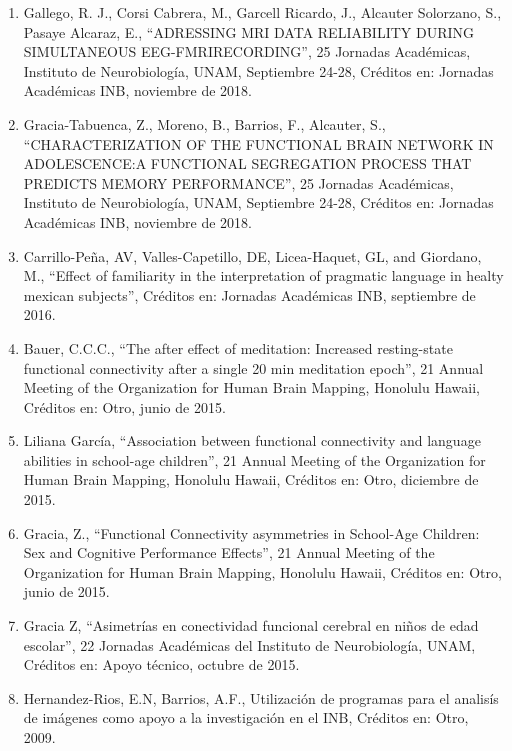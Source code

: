 \begin{enumerate}
\item Gallego, R. J., Corsi Cabrera, M., Garcell Ricardo, J., Alcauter Solorzano, S., Pasaye Alcaraz, E., “ADRESSING MRI DATA RELIABILITY 
DURING 
SIMULTANEOUS EEG-FMRIRECORDING”, 25 Jornadas Académicas, Instituto de Neurobiología, UNAM, Septiembre 24-28, Créditos en: Jornadas Académicas 
INB, noviembre de 2018.

\item Gracia-Tabuenca, Z., Moreno, B., Barrios, F., Alcauter, S., “CHARACTERIZATION OF THE FUNCTIONAL BRAIN NETWORK IN ADOLESCENCE:A 
FUNCTIONAL 
SEGREGATION PROCESS THAT PREDICTS MEMORY PERFORMANCE”, 25 Jornadas Académicas, Instituto de Neurobiología, UNAM, Septiembre 24-28, Créditos 
en: Jornadas Académicas INB, noviembre de 2018.

\item Carrillo-Peña, AV, Valles-Capetillo, DE, Licea-Haquet, GL, and Giordano, M., “Effect of familiarity in the interpretation of pragmatic 
language in healty mexican subjects”, Créditos en: Jornadas Académicas INB, septiembre de 2016.

\item Bauer, C.C.C., “The after effect of meditation: Increased resting-state functional connectivity after a single 20 min meditation 
epoch”, 21 
Annual Meeting of the Organization for Human Brain Mapping, Honolulu Hawaii, Créditos en: Otro, junio de 2015.

\item Liliana García, “Association between functional connectivity and language abilities in school-age children”, 21 Annual Meeting of the 
Organization for Human Brain Mapping, Honolulu Hawaii, Créditos en: Otro, diciembre de 2015.

\item Gracia, Z., “Functional Connectivity asymmetries in School-Age Children: Sex and Cognitive Performance Effects”, 21 Annual Meeting of 
the 
Organization for Human Brain Mapping, Honolulu Hawaii, Créditos en: Otro, junio de 2015.

\item Gracia Z, “Asimetrías en conectividad funcional cerebral en niños de edad escolar”, 22 Jornadas Académicas del Instituto de 
Neurobiología, 
UNAM, Créditos en: Apoyo técnico, octubre de 2015.

\item Hernandez-Rios, E.N, Barrios, A.F., Utilización de programas para el analisís de imágenes como apoyo a la investigación en el INB, 
Créditos 
en: Otro, 2009.


\end{enumerate}
